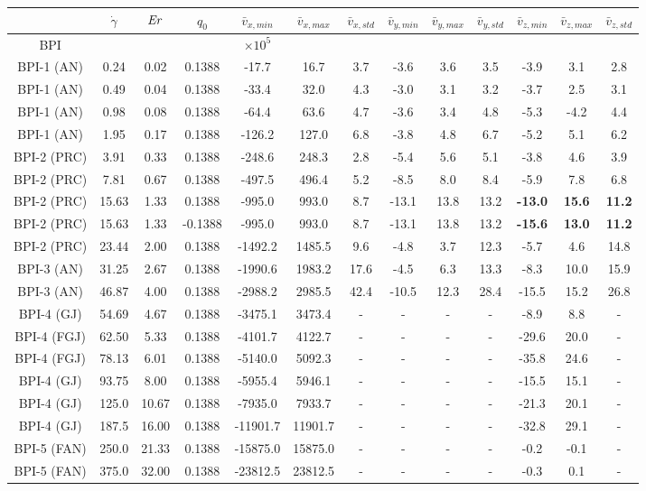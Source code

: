 \documentclass[8.5pt,twoside,twocolumn]{article}
\begin{document}
\begin{table}[htpb]
\begin{tabular}{|c||c|| c || c || c |c |c||c| c| c||c| c| c|}
\hline
& $\dot{\gamma}$ & ${\it Er}$ & $q_0$ & $\bar{v}_{x,min}$ & $\bar{v}_{x,max}$ & $\bar{v}_{x,std}$ & $\bar{v}_{y,min}$ & $\bar{v}_{y,max}$ & $\bar{v}_{y,std}$ & $\bar{v}_{z,min}$ & $\bar{v}_{z,max}$ & $\bar{v}_{z,std}$ \\
\hline
BPI & & & & $\times 10^5$\\
\hline
BPI-1 (AN) &0.24 &0.02 & 0.1388 &-17.7 &16.7 &3.7 &-3.6 &3.6 &3.5 &-3.9 &3.1 &2.8 \\
BPI-1 (AN) &0.49 &0.04 & 0.1388 &-33.4 &32.0 &4.3 &-3.0 &3.1 &3.2 &-3.7 &2.5 &3.1 \\
BPI-1 (AN) &0.98 &0.08 & 0.1388 &-64.4 &63.6 &4.7 &-3.6 &3.4 &4.8 &-5.3 &-4.2 &4.4 \\
BPI-1 (AN) &1.95 &0.17 & 0.1388 &-126.2 &127.0 &6.8 &-3.8 &4.8 &6.7 &-5.2 &5.1 &6.2 \\
\hline
BPI-2 (PRC) &3.91 &0.33 & 0.1388 &-248.6 &248.3 &2.8 &-5.4 &5.6 &5.1 &-3.8 &4.6 &3.9 \\
BPI-2 (PRC) &7.81 &0.67 & 0.1388 &-497.5 &496.4 &5.2 &-8.5 &8.0 &8.4 &-5.9 &7.8 &6.8 \\
BPI-2 (PRC) &15.63 &1.33 & 0.1388 &-995.0 &993.0 &8.7 &-13.1 &13.8 &13.2 &\bf{-13.0} &\bf{15.6} &\bf{11.2} \\
BPI-2 (PRC) &15.63 &1.33 & -0.1388 &-995.0 &993.0 &8.7 &-13.1 &13.8 &13.2 &\bf{-15.6} &\bf{13.0} &\bf{11.2} \\
BPI-2 (PRC) &23.44 &2.00 & 0.1388 &-1492.2 &1485.5 &9.6 &-4.8 &3.7 &12.3 &-5.7 &4.6 &14.8 \\
\hline
BPI-3 (AN) &31.25 &2.67 & 0.1388 &-1990.6 &1983.2 &17.6 &-4.5 &6.3 &13.3 &-8.3 &10.0 &15.9 \\
BPI-3 (AN) &46.87 &4.00 & 0.1388 &-2988.2 &2985.5 &42.4 &-10.5 &12.3 &28.4 &-15.5 &15.2 &26.8 \\
\hline
BPI-4 (GJ) &54.69 &4.67 & 0.1388 &-3475.1 &3473.4 &- &- &- &- &-8.9 &8.8 &- \\
BPI-4 (FGJ) &62.50 &5.33 & 0.1388 &-4101.7 &4122.7 &- &- &- &- &-29.6 &20.0 &- \\
BPI-4 (FGJ) &78.13 &6.01 & 0.1388 &-5140.0 &5092.3 &- &- &- &- &-35.8 &24.6 &- \\
BPI-4 (GJ) &93.75 &8.00 & 0.1388 &-5955.4 &5946.1 &-  &- &- &- &-15.5 &15.1 &- \\
BPI-4 (GJ) &125.0 &10.67 & 0.1388 &-7935.0 &7933.7 &- &- &- &- &-21.3 &20.1 &- \\
BPI-4 (GJ) &187.5 &16.00 & 0.1388 &-11901.7 &11901.7 &- &- &- &- &-32.8 &29.1 &- \\
\hline
BPI-5 (FAN) & 250.0 &21.33 & 0.1388 &-15875.0 &15875.0 &- &- &- &- &-0.2 &-0.1 &- \\
BPI-5 (FAN) & 375.0 &32.00 & 0.1388 &-23812.5 &23812.5 &- &- &- &- &-0.3 &0.1 &- \\
\hline


\end{tabular}
\end{table}
\end{document}
